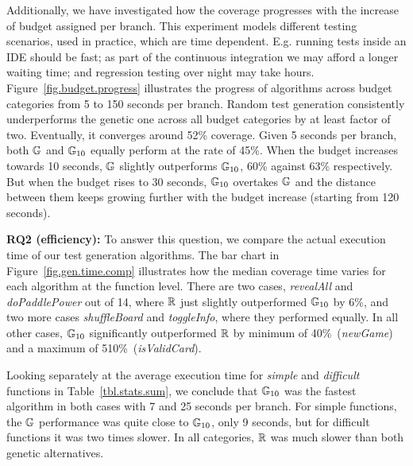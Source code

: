 Additionally, we have investigated how the coverage progresses with the increase of budget assigned per branch. This experiment models different testing scenarios, used in practice, which are time dependent. E.g. running tests inside an IDE should be fast; as part of the continuous integration we may afford a longer waiting time; and regression testing over night may take hours. Figure~\ref{fig.budget.progress} illustrates the progress of algorithms across budget categories from 5 to 150 seconds per branch. Random test generation consistently underperforms the genetic one across all budget categories by at least factor of two. Eventually, it converges around 52\% coverage. Given 5 seconds per branch, both $\mathbb{G}$ and $\mathbb{G}_{10}$ equally perform at the rate of 45\%. When the budget increases towards 10 seconds, $\mathbb{G}$ slightly outperforms $\mathbb{G}_{10}$, 60\% against 63\% respectively. But when the budget rises to 30 seconds, $\mathbb{G}_{10}$ overtakes $\mathbb{G}$ and the distance between them keeps growing further with the budget increase (starting from 120 seconds).\\

\textbf{RQ2 (efficiency):} To answer this question, we compare the actual execution time of our test generation algorithms. The bar chart in Figure~\ref{fig.gen.time.comp} illustrates how the median coverage time varies for each algorithm at the function level. There are two cases, \emph{revealAll} and \emph{doPaddlePower} out of 14, where $\mathbb{R}$ just slightly outperformed $\mathbb{G}_{10}$ by 6\%, and two more cases \emph{shuffleBoard} and \emph{toggleInfo}, where they performed equally. In all other cases, $\mathbb{G}_{10}$ significantly outperformed $\mathbb{R}$ by minimum of 40\%~(\emph{newGame}) and a maximum of 510\%~(\emph{isValidCard}).

Looking separately at the average execution time for \emph{simple} and \emph{difficult} functions in Table~\ref{tbl.stats.sum}, we conclude that $\mathbb{G}_{10}$ was the fastest algorithm in both cases with  7 and 25 seconds per branch. For simple functions, the $\mathbb{G}$ performance was quite close to $\mathbb{G}_{10}$, only 9 seconds, but for difficult functions it was two times slower. In all categories, $\mathbb{R}$ was much slower than both genetic alternatives.\\

